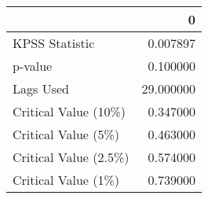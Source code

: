 \begin{tabular}{lr}
\toprule
{} &          0 \\
\midrule
KPSS Statistic        &   0.007897 \\
p-value               &   0.100000 \\
Lags Used             &  29.000000 \\
Critical Value (10\%)  &   0.347000 \\
Critical Value (5\%)   &   0.463000 \\
Critical Value (2.5\%) &   0.574000 \\
Critical Value (1\%)   &   0.739000 \\
\bottomrule
\end{tabular}
